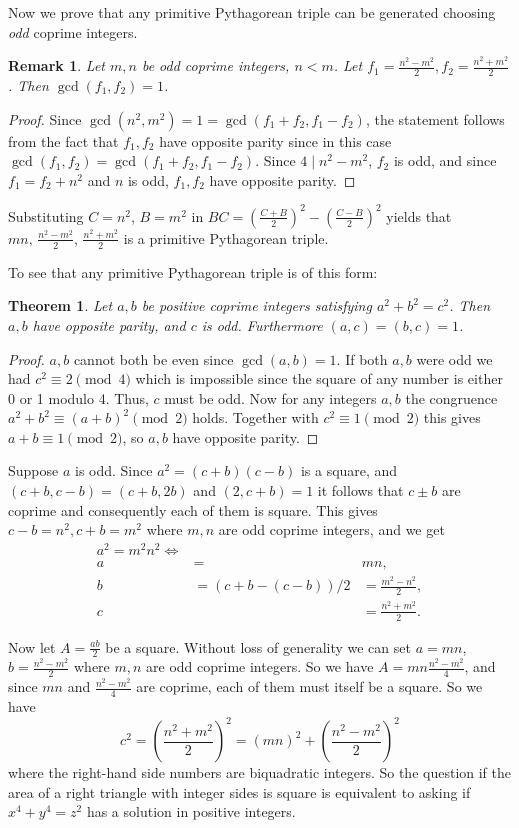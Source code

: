 \documentclass[12pt]{article}
\newtheorem{rmk}{Remark}
\newtheorem{theo}{Theorem}
\begin{document}
Now we prove that any primitive Pythagorean triple can be generated choosing \emph{odd} coprime integers.
\begin{rmk}
Let $m,n$ be odd coprime integers, $n<m$. Let $f_1=\frac{n^2-m^2}{2}, f_2=\frac{n^2+m^2}{2}$. Then $\gcd(f_1,f_2)=1$.
\end{rmk}
\begin{proof}
Since $\gcd(n^2, m^2)=1=\gcd(f_1+f_2, f_1-f_2)$, the statement follows from the fact that $f_1, f_2$ have opposite parity since in this case $\gcd(f_1,f_2)=\gcd(f_1+f_2, f_1-f_2)$. Since $4 \mid n^2-m^2$, $f_2$ is odd, and since $f_1=f_2+n^2$ and $n$ is odd, $f_1,f_2$ have opposite parity.
\end{proof}

Substituting $C=n^2$, $B=m^2$ in $BC=\left(\frac{C+B}{2}\right)^2 -\left(\frac{C-B}{2}\right)^2$ yields that $mn,\, \frac{n^2-m^2}{2},\, \frac{n^2+m^2}{2}$ is a primitive Pythagorean triple.

To see that any primitive Pythagorean triple is of this form:
\begin{theo}
Let $a,b$ be positive coprime integers satisfying $a^2+b^2=c^2$. Then $a,b$ have opposite parity, and $c$ is odd. Furthermore $(a,c)=(b,c)=1$.
\end{theo}
\begin{proof}
$a,b$ cannot both be even since $\gcd(a,b)=1$. If both $a,b$ were odd we had $c^2 \equiv 2 \pmod{4}$ which is impossible since the square of any number is either  0 or 1 modulo 4. Thus, $c$ must be odd. Now for any integers $a,b$ the congruence $a^2+b^2 \equiv (a+b)^2 \pmod{2}$ holds. Together with $c^2\equiv 1 \pmod{2}$ this gives $a+b\equiv 1 \pmod{2}$, so $a,b$ have opposite parity.
\end{proof}
Suppose $a$ is odd. Since $a^2=(c+b)(c-b)$ is a square, and $(c+b, c-b)=(c+b, 2b)$ and $(2,c+b)=1$ it follows that $c \pm b$ are coprime and consequently each of them is square. This gives $c-b=n^2, c+b=m^2$ where $m,n$ are odd coprime integers, and we get
\begin{eqnarray}
a^2=m^2n^2 \Leftrightarrow\\
 a&=&mn,\\
b&=(c+b-(c-b))/2&=\frac{m^2-n^2}{2},\\
c&&=\frac{n^2+m^2}{2}.
\end{eqnarray}

Now let $A=\frac{ab}{2}$ be a square. Without loss of generality we can set $a=mn$, $b=\frac{n^2-m^2}{2}$ where $m,n$ are odd coprime integers. So we have $A=mn\frac{n^2-m^2}{4}$, and since $mn$ and $\frac{n^2-m^2}{4}$ are coprime, each of them must itself be a square. So we have
\begin{equation}
c^2=\left(\frac{n^2+m^2}{2}\right)^2 =(mn)^2 +\left(\frac{n^2-m^2}{2}\right)^2
\end{equation}
where the right-hand side numbers are biquadratic integers. So the question if the area of a right triangle with integer sides is square is equivalent to asking if $x^4+y^4=z^2$ has a solution in positive integers.
\end{document}
